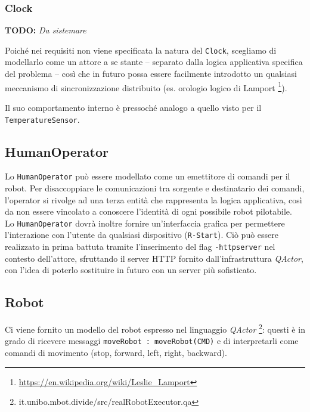 \documentclass{../llncs}
\newcommand{\codescript}[1]{{\mbox{\small{\texttt{#1}}}}\xspace}
\newcommand{\code}[1]{{\color{blue}\small{\texttt{#1}}}}
\newcommand{\qa}{\textsf{\textit{QActor}}}
\newcommand{\todo}[1]{\textbf{TODO:} \emph{#1}}
\begin{document}


\subsubsection{Clock}
\vspace{8px}
\todo{Da sistemare}

Poiché nei requisiti non viene specificata la natura del \texttt{Clock}, scegliamo di modellarlo come un attore a se stante -- separato dalla logica applicativa specifica del problema -- così che in futuro possa essere facilmente introdotto un qualsiasi meccanismo di sincronizzazione distribuito (es. orologio logico di Lamport
\footnote{\url{https://en.wikipedia.org/wiki/Leslie_Lamport}}).



Il suo comportamento interno è pressoché analogo a quello visto per il \texttt{TemperatureSensor}.

\subsection{HumanOperator}
Lo \texttt{HumanOperator} può essere modellato come un emettitore di comandi per il robot. Per disaccoppiare le comunicazioni tra sorgente e destinatario dei comandi, l'operator si rivolge ad una terza entità che rappresenta la logica applicativa, così da non essere vincolato a conoscere l'identità di ogni possibile robot pilotabile.\\



Lo \texttt{HumanOperator} dovrà inoltre fornire un'interfaccia grafica per permettere l'interazione con l'utente da qualsiasi dispositivo (\code{R-Start}). Ciò può essere realizzato in prima battuta tramite l'inserimento del flag \codescript{-httpserver} nel contesto dell'attore, sfruttando il server HTTP fornito dall'infrastruttura \qa, con l'idea di poterlo sostituire in futuro con un server più sofisticato.

\subsection{Robot}
Ci viene fornito un modello del robot espresso nel linguaggio \qa
\footnote{it.unibo.mbot.divide/src/realRobotExecutor.qa}: questi è in grado di ricevere messaggi \codescript{moveRobot : moveRobot(CMD)} e di interpretarli come comandi di movimento (stop, forward, left, right, backward).
\end{document}
